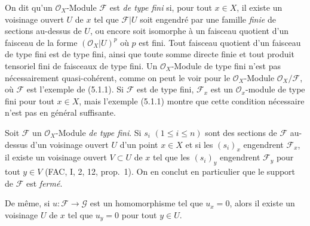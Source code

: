 \begin{env}[5.2.1]
\label{0.5.2.1-fr}
On dit qu'un $\mathcal{O}_X$-Module $\mathcal{F}$ est \emph{de type fini} si,
pour tout $x\in X$, il existe un voisinage ouvert $U$ de $x$ tel que
$\mathcal{F}|U$ soit engendré par une famille \emph{finie} de sections
au-dessus de $U$, ou encore soit isomorphe à un faisceau quotient d'un
faisceau de la forme $(\mathcal{O}_X|U)^p$ où $p$ est fini. Tout faisceau
quotient d'un faisceau de type fini est de type fini, ainsi que toute somme
directe finie et tout produit tensoriel fini de faisceaux de type fini. Un
$\mathcal{O}_X$-Module de type fini n'est pas nécessairement quasi-cohérent,
comme on peut le voir pour le $\mathcal{O}_X$-Module
$\mathcal{O}_X/\mathcal{F}$, où $\mathcal{F}$ est l'exemple de (5.1.1). Si
$\mathcal{F}$ est de type fini, $\mathcal{F}_x$ est un
$\mathcal{O}_x$-module de type fini pour tout $x\in X$, mais l'exemple
(5.1.1) montre que cette condition nécessaire n'est pas en général
suffisante.
\end{env}

\begin{env}[5.2.2]
\label{0.5.2.2-fr}
Soit $\mathcal{F}$ un $\mathcal{O}_X$-Module \emph{de type fini}. Si $s_i$
$(1\leq i\leq n)$ sont des sections de $\mathcal{F}$ au-dessus d'un voisinage
ouvert $U$ d'un point $x\in X$ et si les $(s_i)_x$ engendrent
$\mathcal{F}_x$, il existe un voisinage ouvert $V\subset U$ de $x$ tel que
les $(s_i)_y$ engendrent $\mathcal{F}_y$ pour tout $y\in V$ (FAC, I, 2, 12,
prop.~1). On en conclut en particulier que le support de $\mathcal{F}$ est
\emph{fermé}.


De même, si $u:\mathcal{F}\to\mathcal{G}$ est un homomorphisme tel que
$u_x=0$, alors il existe un voisinage $U$ de $x$ tel que $u_y=0$ pour tout
$y\in U$.
\end{env}

